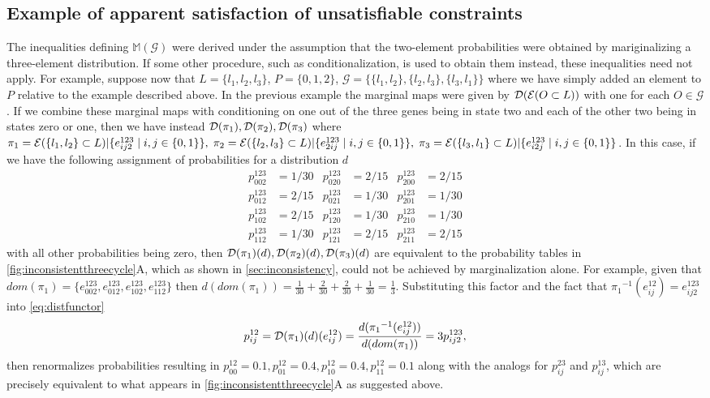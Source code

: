\subsection{Example of apparent satisfaction of unsatisfiable constraints}\label{sec:apparentinconsistency}
The inequalities defining $\mathbb{M}(\mathcal{G})$ were derived under the assumption that the two-element probabilities were obtained by mariginalizing a three-element distribution.  If some other procedure, such as conditionalization, is used to obtain them instead, these inequalities need not apply. For example, suppose now that $L = \{l_1,l_2,l_3 \}$, $P = \{0,1,2\}$, $\mathcal{G} = \{\{l_1,l_2\},\{l_2,l_3\},\{l_3,l_1\}\}$ where we have simply added an element to $P$ relative to the example described above. In the previous example the marginal maps were given by $\mathcal{D} (\mathcal{E} (O \subset L))$ with one for each $O \in \mathcal{G}$. If we combine these marginal maps with conditioning on one out of the three genes being in state two and each of the other two being in states zero or one, then we have instead $\mathcal{D} (\pi_1), \mathcal{D} (\pi_2), \mathcal{D} (\pi_3)$ where $\pi_1 = \mathcal{E} (\{l_1,l_2\} \subset L)|\{ e^{123}_{ij2} \mid i,j \in \{ 0,1 \} \},\; \pi_2 = \mathcal{E} (\{l_2,l_3\} \subset L)|\{ e^{123}_{2ij} \mid i,j \in \{ 0,1 \} \},\; \pi_3 = \mathcal{E} (\{l_3,l_1\} \subset L)|\{ e^{123}_{i2j} \mid i,j \in \{ 0,1 \} \}$. In this case, if we have the following assignment of probabilities for a distribution $d$
\begin{equation}\label{eq:condprobs}
\begin{aligned}
p^{123}_{002} &= 1/30 & p^{123}_{020} &= 2/15 & p^{123}_{200} &= 2/15\\
p^{123}_{012} &= 2/15 & p^{123}_{021} &= 1/30 & p^{123}_{201} &= 1/30\\
p^{123}_{102} &= 2/15 & p^{123}_{120} &= 1/30 & p^{123}_{210} &= 1/30\\
p^{123}_{112} &= 1/30 & p^{123}_{121} &= 2/15 & p^{123}_{211} &= 2/15
\end{aligned}
\end{equation}
with all other probabilities being zero, then $\mathcal{D} (\pi_1)(d), \mathcal{D} (\pi_2)(d), \mathcal{D} (\pi_3)(d)$ are equivalent to the probability tables in \ref{fig:inconsistentthreecycle}A, which as shown in \ref{sec:inconsistency}, could not be achieved by marginalization alone. For example, given that $dom(\pi_1) = \{ e^{123}_{002}, e^{123}_{012}, e^{123}_{102}, e^{123}_{112} \}$ then $d(dom(\pi_1)) = \frac{1}{30} + \frac{2}{30} + \frac{2}{30} + \frac{1}{30} = \frac{1}{3}$. Substituting this factor and the fact that ${\pi_1}^{-1}(e^{12}_{ij}) = e^{123}_{ij2}$ into \ref{eq:distfunctor}
$$
p^{12}_{ij} = \mathcal{D} (\pi_1)(d)(e^{12}_{ij}) = \frac{d({\pi_1}^{-1}(e^{12}_{ij}))}{d(dom(\pi_1))} = 3 p^{123}_{ij2},
$$
then renormalizes probabilities resulting in $p^{12}_{00} = 0.1, p^{12}_{01} = 0.4, p^{12}_{10} = 0.4, p^{12}_{11} = 0.1$ along with the analogs for $p^{23}_{ij}$ and $p^{13}_{ij}$, which are precisely equivalent to what appears in \ref{fig:inconsistentthreecycle}A as suggested above.

